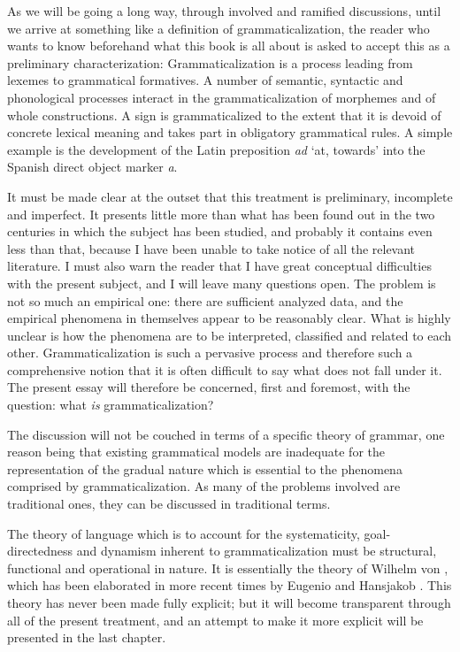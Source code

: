 
As we will be going a long way, through involved and ramified discussions, until we arrive at something like a definition of grammaticalization, the reader who wants to know beforehand what this book is all about is asked to accept this as a preliminary characterization: Grammaticalization is a process leading from lexemes to grammatical formatives. A number of semantic, syntactic and phonological processes interact in the grammaticalization of morphemes and of whole constructions. A sign is grammaticalized to the extent that it is devoid of concrete lexical meaning and takes part in obligatory grammatical rules. A simple example is the development of the Latin preposition \textit{ad} ‘at, towards’ into the Spanish direct object marker \textit{a}.

It must be made clear at the outset that this treatment is preliminary, incomplete and imperfect. It presents little more than what has been found out in the two centuries in which the subject has been studied, and probably it contains even less than that, because I have been unable to take notice of all the relevant literature. I must also warn the reader that I have great conceptual difficulties with the present subject, and I will leave many questions open. The problem is not so much an empirical one: there are sufficient analyzed data, and the empirical phenomena in themselves appear to be reasonably clear. What is highly unclear is how the phenomena are to be interpreted, classified and related to each other. Grammaticalization is such a pervasive process and therefore such a comprehensive notion that it is often difficult to say what does not fall under it. The present essay will therefore be concerned, first and foremost, with the question: what \textit{is} grammaticalization?

The discussion will not be couched in terms of a specific theory of grammar, one reason being that existing grammatical models are inadequate for the representation of the gradual nature which is essential to the phenomena comprised by grammaticalization. As many of the problems involved are traditional ones, they can be discussed in traditional terms.

The theory of language which is to account for the systematicity, goal-\linebreak directedness and dynamism inherent to grammaticalization must be structural, functional and operational in nature. It is essentially the theory of Wilhelm von \citet{Humboldt1836}, which has been elaborated in more recent times by Eugenio \citet{Coseriu1974} and Hansjakob \citet{Seiler1978}. This theory has never been made fully explicit; but it will become transparent through all of the present treatment, and an attempt to make it more explicit will be presented in the last chapter.

